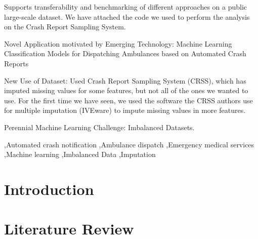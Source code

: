 \documentclass[fleqn]{cas-sc}
\begin{document}

\begin{highlights}
	\item  Supports transferability and benchmarking of different approaches on a public large-scale dataset.  We have attached the code we used to perform the analysis on the Crash Report Sampling System.  
	\item Novel Application motivated by Emerging Technology:  Machine Learning Classification Models for Dispatching Ambulances based on Automated Crash Reports
	\item New Use of Dataset:  Used Crash Report Sampling System (CRSS), which has imputed missing values for some features, but not all of the ones we wanted to use.  For the first time we have seen, we used the software the CRSS authors use for multiple imputation (IVEware) to impute missing values in more features.  
	\item Perennial Machine Learning Challenge:  Imbalanced Datasets.
\end{highlights}

\begin{keywords}
 \sep Automated crash notification \sep Ambulance dispatch \sep Emergency medical services  \sep Machine learning \sep Imbalanced Data \sep Imputation
\end{keywords}

\maketitle


%
%
%

\section{Introduction}\label{sec:Introduction}



\section{Literature Review}\label{LitReview}

\end{document}
